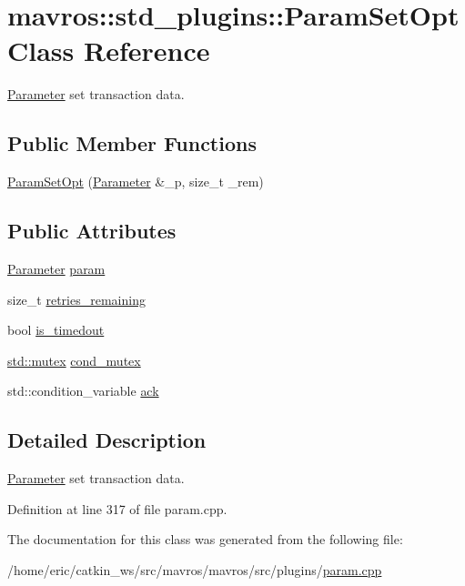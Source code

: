 \hypertarget{classmavros_1_1std__plugins_1_1ParamSetOpt}{}\section{mavros\+::std\+\_\+plugins\+::Param\+Set\+Opt Class Reference}
\label{classmavros_1_1std__plugins_1_1ParamSetOpt}


\mbox{\hyperlink{classmavros_1_1std__plugins_1_1Parameter}{Parameter}} set transaction data.  


\subsection*{Public Member Functions}
\begin{DoxyCompactItemize}
\item 
\mbox{\hyperlink{group__plugin_ga5fde2c30705fd08fa9eeee30a882633a}{Param\+Set\+Opt}} (\mbox{\hyperlink{classmavros_1_1std__plugins_1_1Parameter}{Parameter}} \&\+\_\+p, size\+\_\+t \+\_\+rem)
\end{DoxyCompactItemize}
\subsection*{Public Attributes}
\begin{DoxyCompactItemize}
\item 
\mbox{\hyperlink{classmavros_1_1std__plugins_1_1Parameter}{Parameter}} \mbox{\hyperlink{group__plugin_ga76100850b31cc9972cb5ce440d1a4684}{param}}
\item 
size\+\_\+t \mbox{\hyperlink{group__plugin_ga248de6628eca54d86cc6b52623434639}{retries\+\_\+remaining}}
\item 
bool \mbox{\hyperlink{group__plugin_gad60618c9119e01a1c6aecc962d324ac3}{is\+\_\+timedout}}
\item 
\mbox{\hyperlink{data_8c_a4acff8232e4aec9cd5c6dc200ac55ef3}{std\+::mutex}} \mbox{\hyperlink{group__plugin_gaf0fa92985f3662f53eb22c56db12d544}{cond\+\_\+mutex}}
\item 
std\+::condition\+\_\+variable \mbox{\hyperlink{group__plugin_ga621db3cd15ad70ca2fbbf3eb6b8363af}{ack}}
\end{DoxyCompactItemize}


\subsection{Detailed Description}
\mbox{\hyperlink{classmavros_1_1std__plugins_1_1Parameter}{Parameter}} set transaction data. 

Definition at line 317 of file param.\+cpp.



The documentation for this class was generated from the following file\+:\begin{DoxyCompactItemize}
\item 
/home/eric/catkin\+\_\+ws/src/mavros/mavros/src/plugins/\mbox{\hyperlink{param_8cpp}{param.\+cpp}}\end{DoxyCompactItemize}
